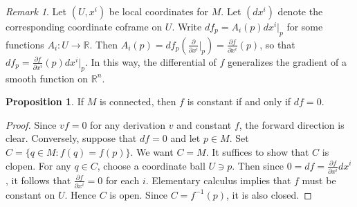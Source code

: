 \documentclass[10pt,letterpaper,cm]{nupset}
\theoremstyle{definition}
\theoremstyle{theorem}
\newtheorem{prop}[definition]{Proposition}
\theoremstyle{remark}
\newtheorem{remark}[definition]{Remark}
\newcommand{\R}{\mathbb R}
\newcommand{\1}{\mathbf{1}}
\newcommand{\0}{\vec 0}
\begin{document}
\begin{remark}
Let $(U, x^i)$ be local coordinates for $M$. Let $(dx^i)$ denote the corresponding coordinate coframe on $U$. Write $df_p = A_i(p)dx^i\bigr\rvert_p$ for some functions $A_i : U \to \R$. Then $A_i(p) = df_p\left(\frac{\partial}{\partial{x^i}}\bigr\rvert_p\right) = \frac{\partial{f}}{\partial{x^i}}(p)$, so that $df_p = \frac{\partial{f}}{\partial{x^i}}(p) dx^i\bigr\rvert_p$. In this way, the differential of $f$ generalizes the gradient of a smooth function on $\R^n$.
\end{remark}

\begin{prop}
If $M$ is connected, then $f$ is constant if and only if $df = 0$. 
\end{prop}
\begin{proof}
Since $vf = 0$ for any derivation $v$ and constant $f$, the forward direction is clear. Conversely, suppose that $df = 0$ and let $p\in M$. Set $C = \{q \in M : f(q) = f(p)\}$. We want $C = M$. It suffices to show that $C$ is clopen. For any $q\in C$, choose a coordinate ball $U\ni p$. Then since $0 = df = \frac{\partial{f}}{\partial{x^i}}dx^i$, it follows that $\frac{\partial{f}}{\partial{x^i}} = 0$ for each $i$. Elementary calculus implies that $f$ must be constant on $U$. Hence $C$ is open. Since $C = f^{-1}(p)$, it is also closed.
\end{proof}
\end{document}

